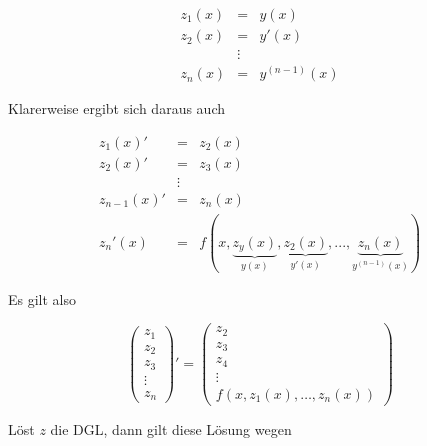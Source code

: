 \documentclass[10pt,a4paper]{article}
\begin{document}
\begin{eqnarray*}
z_1(x)&=&y(x) \\
z_2(x)&=&y'(x) \\
& \vdots & \\
z_n(x)&=&y^{(n-1)}(x)
\end{eqnarray*}


Klarerweise ergibt sich daraus auch

\begin{eqnarray*}
z_1(x)'		&=		&z_2(x) \\
z_2(x)'		&=		&z_3(x) \\
			&\vdots	& \\
z_{n-1}(x)'	&=		&z_n(x) \\
z_n'(x)		&=		& f(x,\underbrace{ z_y(x)}_{y(x)}, \underbrace{z_2(x)}_{y'(x)},..., \underbrace{z_n(x)}_{y^{(n-1)}(x)})
\end{eqnarray*}

Es gilt also

\begin{equation}
\begin{pmatrix}
z_1 \\ z_2 \\ z_3 \\ \vdots \\ z_n
\end{pmatrix}' = 
\begin{pmatrix}
z_2 \\z_3 \\z_4\\ \vdots \\ f(x, z_1(x),\ldots, z_n(x))
\end{pmatrix}
\end{equation}

Löst $z$ die DGL, dann gilt diese Lösung wegen
\end{document}
